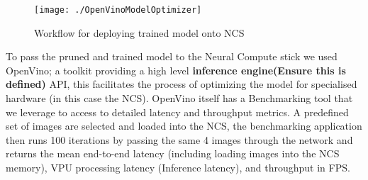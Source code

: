 \documentclass[../Dissertation.tex]{subfiles}
\begin{document}
\begin{figure}[H]
	\centering
	\texttt{[image: ./OpenVinoModelOptimizer]}
	\caption{Workflow for deploying trained model onto NCS \autocite{ModelOptimizerDeveloper}}
	\label{fig:OpenVinoWorkflow}
\end{figure}


To pass the pruned and trained model to the Neural Compute stick we used OpenVino; a toolkit providing a high level \textbf{inference engine(Ensure this is defined)} API, this facilitates the process of optimizing the model for specialised hardware (in this case the NCS). 
OpenVino itself has a Benchmarking tool that we leverage to access to detailed latency and throughput metrics. A predefined set of images are selected and loaded into the NCS, the benchmarking application then runs 100 iterations by passing the same 4 images through the network and returns the mean end-to-end latency (including loading images into the NCS memory), VPU processing latency (Inference latency), and throughput in FPS.
\end{document}
